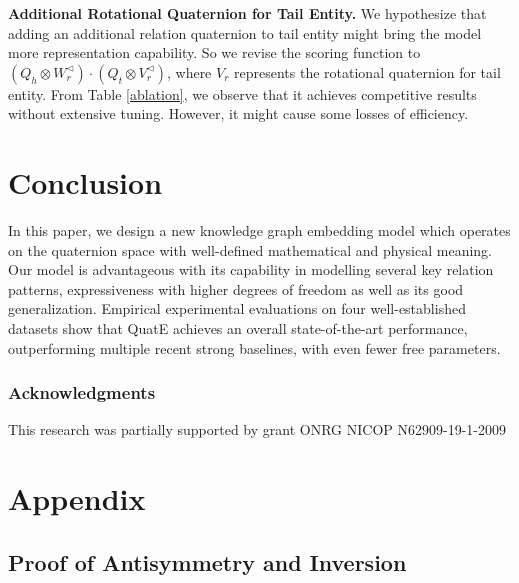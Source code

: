 \documentclass{article}
\begin{document}
\textbf{Additional Rotational Quaternion for Tail Entity.} We hypothesize that adding an additional relation quaternion to tail entity might bring the model more representation capability. So we revise the scoring function to $(Q_h \otimes W_{r}^{\triangleleft}) \cdot (Q_t \otimes V_{r}^{\triangleleft})$, where $V_{r}$ represents the rotational quaternion for tail entity. From Table \ref{ablation}, we observe that it achieves competitive results without extensive tuning. However, it might cause some losses of efficiency.



\section{Conclusion}
In this paper, we design a new knowledge graph embedding model which operates on the quaternion space with well-defined mathematical and physical meaning. Our model is advantageous with its capability in modelling several key relation patterns, expressiveness with higher degrees of freedom as well as its good generalization. Empirical experimental evaluations on four well-established datasets show that QuatE achieves an overall state-of-the-art performance, outperforming multiple recent strong baselines, with even fewer free parameters.

\subsubsection*{Acknowledgments}
This research was partially supported by grant ONRG NICOP N62909-19-1-2009







\newpage

\section{Appendix}

\subsection{Proof of Antisymmetry and Inversion}
\end{document}
